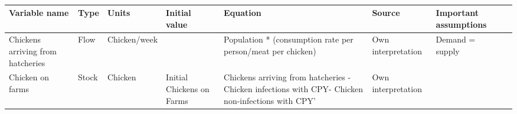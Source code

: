 
\begin{landscape}
\begin{longtable}[c]{m{10em}lllm{15em}lll}
\caption{}
\label{tab:my-table}\\
Variable name                                 & Type     & Units                    & Initial value             & Equation                                                                                                                                                                                                                                                                                 & Source                                                                                                                                                                                       & Important assumptions                                                                                                                                                                                                                 \\
\endfirsthead
%
\endhead
%
Chickens arriving from hatcheries             & Flow     & Chicken/week             &                           & Population * (consumption rate per person/meat per chicken)                                                                                                                                                                                                                              & Own interpretation                                                                                                                                                                           & Demand = supply                                                                                                                                                                                                                       \\
Chicken on farms                              & Stock    & Chicken                  & Initial Chickens on Farms & Chickens arriving from hatcheries - Chicken infections with CPY- Chicken non-infections with CPY'                                                                                                                                                                                        & Own interpretation                                                                                                                                                                           &                                                                                                                                                                                                                                       \\

\end{longtable}
\end{landscape}
